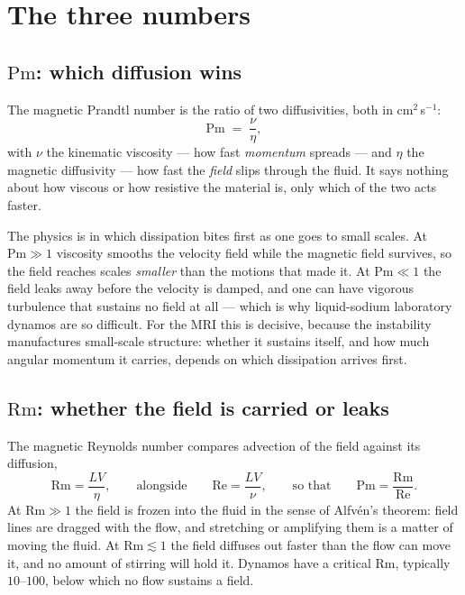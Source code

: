 \documentclass[11pt,a4paper]{article}
\newcommand{\Pm}{\mathrm{Pm}}
\newcommand{\Rm}{\mathrm{Rm}}
\newcommand{\Rey}{\mathrm{Re}}
\begin{document}
\section{The three numbers}

\subsection{$\Pm$: which diffusion wins}

The magnetic Prandtl number is the ratio of two diffusivities, both in
cm$^2$\,s$^{-1}$:
\begin{equation}
  \Pm \;=\; \frac{\nu}{\eta},
\end{equation}
with $\nu$ the kinematic viscosity --- how fast \emph{momentum} spreads --- and
$\eta$ the magnetic diffusivity --- how fast the \emph{field} slips through the
fluid. It says nothing about how viscous or how resistive the material is, only
which of the two acts faster.

The physics is in which dissipation bites first as one goes to small scales.
At $\Pm \gg 1$ viscosity smooths the velocity field while the magnetic field
survives, so the field reaches scales \emph{smaller} than the motions that made
it. At $\Pm \ll 1$ the field leaks away before the velocity is damped, and one
can have vigorous turbulence that sustains no field at all --- which is why
liquid-sodium laboratory dynamos are so difficult. For the MRI this is decisive,
because the instability manufactures small-scale structure: whether it sustains
itself, and how much angular momentum it carries, depends on which dissipation
arrives first.

\subsection{$\Rm$: whether the field is carried or leaks}

The magnetic Reynolds number compares advection of the field against its
diffusion,
\begin{equation}
  \Rm = \frac{LV}{\eta},
  \qquad\text{alongside}\qquad
  \Rey = \frac{LV}{\nu},
  \qquad\text{so that}\qquad
  \Pm = \frac{\Rm}{\Rey}.
\end{equation}
At $\Rm \gg 1$ the field is frozen into the fluid in the sense of Alfv\'en's
theorem: field lines are dragged with the flow, and stretching or amplifying
them is a matter of moving the fluid. At $\Rm \lesssim 1$ the field diffuses out
faster than the flow can move it, and no amount of stirring will hold it.
Dynamos have a critical $\Rm$, typically $10$--$100$, below which no flow
sustains a field.
\end{document}
